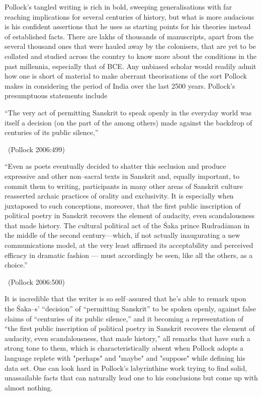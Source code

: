 Pollock’s tangled writing is rich in bold, sweeping generalisations with far reaching implications for several centuries of history, but what is more audacious is his confident assertions that he uses as starting points for his theories instead of established facts. There are lakhs of thousands of manuscripts, apart from the several thousand ones that were hauled away by the colonisers, that are yet to be collated and studied across the country to know more about the conditions in the past millennia, especially that of BCE. Any unbiased scholar would readily admit how one is short of material to make aberrant theorisations of the sort Pollock makes in considering the period of India over the last 2500 years. Pollock’s presumptuous statements include

\begin{myquote}
“The very act of permitting Sanskrit to speak openly in the everyday world was itself a decision (on the part of the among others) made against the backdrop of centuries of its public silence,” 

~\hfill (Pollock 2006:499)
\end{myquote}

\begin{myquote}
“Even as poets eventually decided to shatter this seclusion and produce expressive and other non–sacral texts in Sanskrit and, equally important, to commit them to writing, participants in many other areas of Sanskrit culture reasserted archaic practices of orality and exclusivity. It is especially when juxtaposed to such conceptions, moreover, that the first public inscription of political poetry in Sanskrit recovers the element of audacity, even scandalousness that made history. The cultural political act of the Śaka prince Rudradāman in the middle of the second century—which, if not actually inaugurating a new communications model, at the very least affirmed its acceptability and perceived efficacy in dramatic fashion — must accordingly be seen, like all the others, as a choice.” 

~\hfill (Pollock 2006:500)
\end{myquote}

It is incredible that the writer is so self–assured that he’s able to remark upon the Śaka–s' “decision” of “permitting Sanskrit” to be spoken openly, against false claims of “centuries of its public silence,” and it becoming a representation of “the first public inscription of political poetry in Sanskrit recovers the element of audacity, even scandalousness, that made history,” all remarks that have such a strong tone to them, which is characteristically absent when Pollock adopts a language replete with "perhaps" and "maybe" and "suppose" while defining his data set. One can look hard in Pollock’s labyrinthine work trying to find solid, unassailable facts that can naturally lead one to his conclusions but come up with almost nothing.

